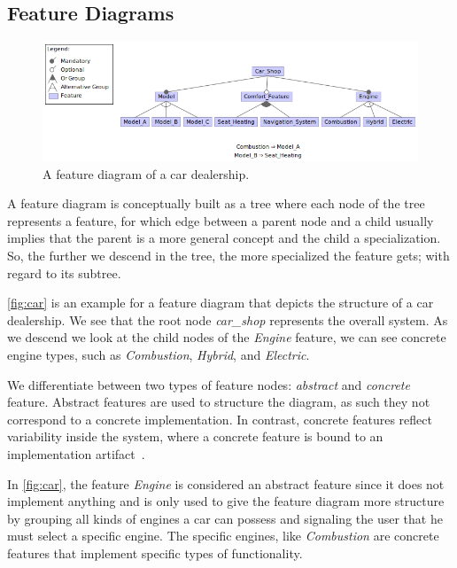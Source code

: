 \subsection{Feature Diagrams}\label{ch:feature-diagram}

\begin{figure}[h]
    \centering
    \includegraphics[scale=0.55]{gfx/Car_Shop.png}
    \caption{A feature diagram of a car dealership.}
    \label{fig:car}
\end{figure}

A feature diagram is conceptually built as a tree where each node of the tree represents a feature, 
for which edge between a parent node and a child usually implies that the parent is a more general concept and the child a specialization. 
So, the further we descend in the tree, the more specialized the feature gets; with regard to its subtree.

\autoref{fig:car} is an example for a feature diagram that depicts the structure of a car dealership. We see that the root
node \textit{car\_shop} represents the overall system. As we descend we look at the child nodes of the
\textit{Engine} feature, we can see concrete engine types, such as \textit{Combustion}, \textit{Hybrid}, and \textit{Electric}.

We differentiate between two types of feature nodes: \emph{abstract} and \emph{concrete} feature. 
Abstract features are used to structure the diagram, as such they not correspond to a concrete implementation.
In contrast, concrete features reflect variability inside the system, where a concrete feature is bound to an implementation artifact~\cite{Feature-Oriented-Software-Product-Lines}.

In \autoref{fig:car}, the feature \textit{Engine} is considered an abstract feature since it does not implement anything and 
is only used to give the feature diagram more structure by grouping all kinds of engines a car can possess and signaling 
the user that he must select a specific engine.
The specific engines, like \textit{Combustion} are concrete features that implement specific types of functionality.

